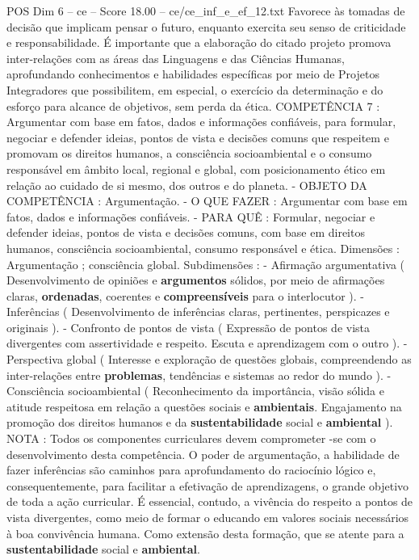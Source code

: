 \begin{textsample}{POS Dim 6 – ce – Score 18.00 – ce/ce\_inf\_e\_ef\_12.txt}
Favorece às tomadas de decisão que implicam pensar o futuro, enquanto exercita seu senso de criticidade e responsabilidade.
É importante que a elaboração do citado projeto promova inter-relações com as áreas das Linguagens e das Ciências Humanas, aprofundando conhecimentos e habilidades específicas por meio de Projetos Integradores que possibilitem, em especial, o exercício da determinação e do esforço para alcance de objetivos, sem perda da ética.
COMPETÊNCIA 7 : Argumentar com base em fatos, dados e informações confiáveis, para formular, negociar e defender ideias, pontos de vista e decisões comuns que respeitem e promovam os direitos humanos, a consciência socioambiental e o consumo responsável em âmbito local, regional e global, com posicionamento ético em relação ao cuidado de si mesmo, dos outros e do planeta. - OBJETO DA COMPETÊNCIA : Argumentação. - O QUE FAZER : Argumentar com base em fatos, dados e informações confiáveis. - PARA QUÊ : Formular, negociar e defender ideias, pontos de vista e decisões comuns, com base em direitos humanos, consciência socioambiental, consumo responsável e ética.
Dimensões : Argumentação ; consciência global.
Subdimensões : - Afirmação argumentativa ( Desenvolvimento de opiniões e \textbf{argumentos} sólidos, por meio de afirmações claras, \textbf{ordenadas}, coerentes e \textbf{compreensíveis} para o interlocutor ). - Inferências ( Desenvolvimento de inferências claras, pertinentes, perspicazes e originais ). - Confronto de pontos de vista ( Expressão de pontos de vista divergentes com assertividade e respeito.
Escuta e aprendizagem com o outro ). - Perspectiva global ( Interesse e exploração de questões globais, compreendendo as inter-relações entre \textbf{problemas}, tendências e sistemas ao redor do mundo ). - Consciência socioambiental ( Reconhecimento da importância, visão sólida e atitude respeitosa em relação a questões sociais e \textbf{ambientais}.
Engajamento na promoção dos direitos humanos e da \textbf{sustentabilidade} social e \textbf{ambiental} ).
NOTA : Todos os componentes curriculares devem comprometer -se com o desenvolvimento desta competência.
O poder de argumentação, a habilidade de fazer inferências são caminhos para aprofundamento do raciocínio lógico e, consequentemente, para facilitar a efetivação de aprendizagens, o grande objetivo de toda a ação curricular.
É essencial, contudo, a vivência do respeito a pontos de vista divergentes, como meio de formar o educando em valores sociais necessários à boa convivência humana.
Como extensão desta formação, que se atente para a \textbf{sustentabilidade} social e \textbf{ambiental}.

\end{textsample}
